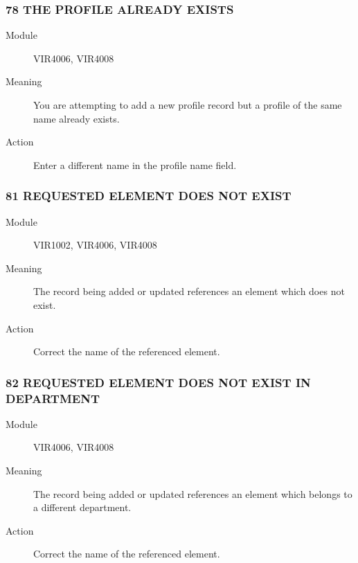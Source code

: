 \documentclass[letterpaper,10pt,english]{sphinxmanual}
\begin{document}
\subsubsection{78 THE PROFILE ALREADY EXISTS}
\label{\detokenize{messages:the-profile-already-exists}}\begin{description}
\item[{Module}] \leavevmode
VIR4006, VIR4008

\item[{Meaning}] \leavevmode
You are attempting to add a new profile record but a profile of the same name already exists.

\item[{Action}] \leavevmode
Enter a different name in the profile name field.

\end{description}


\subsubsection{81 REQUESTED ELEMENT DOES NOT EXIST}
\label{\detokenize{messages:requested-element-does-not-exist}}\begin{description}
\item[{Module}] \leavevmode
VIR1002, VIR4006, VIR4008

\item[{Meaning}] \leavevmode
The record being added or updated references an element which does not exist.

\item[{Action}] \leavevmode
Correct the name of the referenced element.

\end{description}


\subsubsection{82 REQUESTED ELEMENT DOES NOT EXIST IN DEPARTMENT}
\label{\detokenize{messages:requested-element-does-not-exist-in-department}}\begin{description}
\item[{Module}] \leavevmode
VIR4006, VIR4008

\item[{Meaning}] \leavevmode
The record being added or updated references an element which belongs to a different department.

\item[{Action}] \leavevmode
Correct the name of the referenced element.

\end{description}
\end{document}
